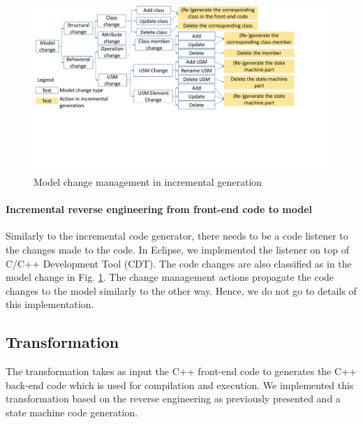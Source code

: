 \begin{figure}
	\centering
	\includegraphics[clip, trim=0.2cm 7.2cm 4.0cm 0.0cm, width=1\columnwidth]{figures/modelchange.pdf}
	\caption{Model change management in incremental generation} 
	\label{fig:modelchange}
\end{figure}

\noindent
\paragraph{Incremental reverse engineering from front-end code to model}
Similarly to the incremental code generator, there needs to be a code listener to the changes made to the code.
In Eclipse, we implemented the listener on top of C/C++ Development Tool (CDT).
The code changes are also classified as in the model change in Fig. \ref{fig:modelchange}.
The change management actions propagate the code changes to the model similarly to the other way.
Hence, we do not go to details of this implementation. 




\subsection{Transformation}
The transformation takes as input the C++ front-end code to generates the C++ back-end code which is used for compilation and execution.
We implemented this transformation based on the reverse engineering as previously presented and a state machine code generation. 

